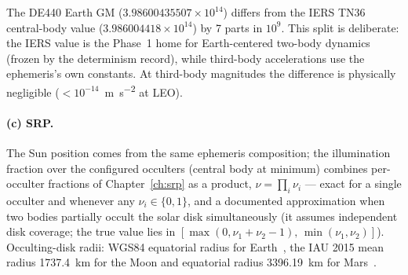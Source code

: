 The DE440 Earth GM ($3.98600435507\times10^{14}$) differs from the IERS
TN36 central-body value ($3.986004418\times10^{14}$) by 7 parts in
$10^{9}$. This split is deliberate: the IERS value is the Phase~1 home
for Earth-centered two-body dynamics (frozen by the determinism record),
while third-body accelerations use the ephemeris's own constants. At
third-body magnitudes the difference is physically negligible
($<10^{-14}$~\unit{\metre\per\second\squared} at LEO).

\paragraph{(c) SRP.} The Sun position comes from the same ephemeris
composition; the illumination fraction over the configured occulters
(central body at minimum) combines per-occulter fractions of
Chapter~\ref{ch:srp} as a product,
$\nu = \prod_i \nu_i$ --- exact for a single occulter and whenever any
$\nu_i \in \{0, 1\}$, and a documented approximation when two bodies
partially occult the solar disk simultaneously (it assumes independent
disk coverage; the true value lies in
$[\max(0, \nu_1{+}\nu_2{-}1),\, \min(\nu_1,\nu_2)]$). Occulting-disk
radii: WGS84 equatorial radius for Earth~\cite{nima2000}, the IAU 2015
mean radius \qty{1737.4}{\kilo\metre} for the Moon and equatorial radius
\qty{3396.19}{\kilo\metre} for Mars~\cite{archinal2018}.

